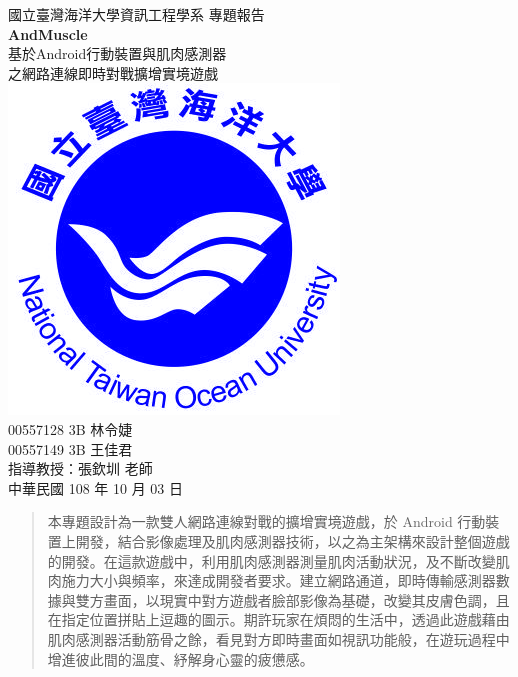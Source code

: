 \documentclass[12pt]{article}  %
\theoremstyle{plain}
\begin{document}
\begin{titlepage}  %
\begin{center}
\Large 國立臺灣海洋大學資訊工程學系 專題報告\\
\vspace*{10ex}
\Huge \textbf{AndMuscle}\\
\LARGE 基於Android行動裝置與肌肉感測器\\
\LARGE 之網路連線即時對戰擴增實境遊戲\\
\vspace*{8ex}
\includegraphics[scale=1.0]{ntoulogo.jpg}\\
\vspace*{5ex}
\Large 00557128 3B 林令婕\\
\Large 00557149 3B 王佳君\\
\vspace*{2ex}
\Large 指導教授：張欽圳 老師\\
\vspace*{10ex}
\Large 中華民國 108 年 10 月 03 日
\end{center}
\end{titlepage}

\begin{abstract}  %
本專題設計為一款雙人網路連線對戰的擴增實境遊戲，於 Android 行動裝置上開發，結合影像處理及肌肉感測器技術，以之為主架構來設計整個遊戲的開發。在這款遊戲中，利用肌肉感測器測量肌肉活動狀況，及不斷改變肌肉施力大小與頻率，來達成開發者要求。建立網路通道，即時傳輸感測器數據與雙方畫面，以現實中對方遊戲者臉部影像為基礎，改變其皮膚色調，且在指定位置拼貼上逗趣的圖示。期許玩家在煩悶的生活中，透過此遊戲藉由肌肉感測器活動筋骨之餘，看見對方即時畫面如視訊功能般，在遊玩過程中增進彼此間的溫度、紓解身心靈的疲憊感。

\end{abstract}
\newpage  %
\end{document}
